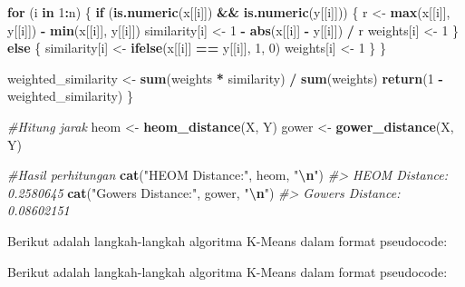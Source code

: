 \documentclass[
  oneside]{book}
\newenvironment{Shaded}{\begin{snugshade}}{\end{snugshade}}
\newcommand{\CommentTok}[1]{\textcolor[rgb]{0.56,0.35,0.01}{\textit{#1}}}
\newcommand{\ControlFlowTok}[1]{\textcolor[rgb]{0.13,0.29,0.53}{\textbf{#1}}}
\newcommand{\DecValTok}[1]{\textcolor[rgb]{0.00,0.00,0.81}{#1}}
\newcommand{\FunctionTok}[1]{\textcolor[rgb]{0.13,0.29,0.53}{\textbf{#1}}}
\newcommand{\NormalTok}[1]{#1}
\newcommand{\OtherTok}[1]{\textcolor[rgb]{0.56,0.35,0.01}{#1}}
\newcommand{\SpecialCharTok}[1]{\textcolor[rgb]{0.81,0.36,0.00}{\textbf{#1}}}
\newcommand{\StringTok}[1]{\textcolor[rgb]{0.31,0.60,0.02}{#1}}
\begin{document}
\begin{Shaded}
\begin{Highlighting}[]
  \ControlFlowTok{for}\NormalTok{ (i }\ControlFlowTok{in} \DecValTok{1}\SpecialCharTok{:}\NormalTok{n) \{}
    \ControlFlowTok{if}\NormalTok{ (}\FunctionTok{is.numeric}\NormalTok{(x[[i]]) }\SpecialCharTok{\&\&} \FunctionTok{is.numeric}\NormalTok{(y[[i]])) \{}
\NormalTok{      r }\OtherTok{\textless{}{-}} \FunctionTok{max}\NormalTok{(x[[i]], y[[i]]) }\SpecialCharTok{{-}} \FunctionTok{min}\NormalTok{(x[[i]], y[[i]])}
\NormalTok{      similarity[i] }\OtherTok{\textless{}{-}} \DecValTok{1} \SpecialCharTok{{-}} \FunctionTok{abs}\NormalTok{(x[[i]] }\SpecialCharTok{{-}}\NormalTok{ y[[i]]) }\SpecialCharTok{/}\NormalTok{ r}
\NormalTok{      weights[i] }\OtherTok{\textless{}{-}} \DecValTok{1}
\NormalTok{    \} }\ControlFlowTok{else}\NormalTok{ \{}
\NormalTok{      similarity[i] }\OtherTok{\textless{}{-}} \FunctionTok{ifelse}\NormalTok{(x[[i]] }\SpecialCharTok{==}\NormalTok{ y[[i]], }\DecValTok{1}\NormalTok{, }\DecValTok{0}\NormalTok{)}
\NormalTok{      weights[i] }\OtherTok{\textless{}{-}} \DecValTok{1}
\NormalTok{    \}}
\NormalTok{  \}}
  
\NormalTok{  weighted\_similarity }\OtherTok{\textless{}{-}} \FunctionTok{sum}\NormalTok{(weights }\SpecialCharTok{*}\NormalTok{ similarity) }\SpecialCharTok{/} \FunctionTok{sum}\NormalTok{(weights)}
  \FunctionTok{return}\NormalTok{(}\DecValTok{1} \SpecialCharTok{{-}}\NormalTok{ weighted\_similarity)}
\NormalTok{\}}

\CommentTok{\#Hitung jarak}
\NormalTok{heom }\OtherTok{\textless{}{-}} \FunctionTok{heom\_distance}\NormalTok{(X, Y)}
\NormalTok{gower }\OtherTok{\textless{}{-}} \FunctionTok{gower\_distance}\NormalTok{(X, Y)}

\CommentTok{\#Hasil perhitungan}
\FunctionTok{cat}\NormalTok{(}\StringTok{"HEOM Distance:"}\NormalTok{, heom, }\StringTok{"}\SpecialCharTok{\textbackslash{}n}\StringTok{"}\NormalTok{)}
\CommentTok{\#\textgreater{} HEOM Distance: 0.2580645}
\FunctionTok{cat}\NormalTok{(}\StringTok{"Gower\textquotesingle{}s Distance:"}\NormalTok{, gower, }\StringTok{"}\SpecialCharTok{\textbackslash{}n}\StringTok{"}\NormalTok{)}
\CommentTok{\#\textgreater{} Gower\textquotesingle{}s Distance: 0.08602151}
\end{Highlighting}
\end{Shaded}

Berikut adalah langkah-langkah algoritma K-Means dalam format pseudocode:

Berikut adalah langkah-langkah algoritma K-Means dalam format pseudocode:
\end{document}
